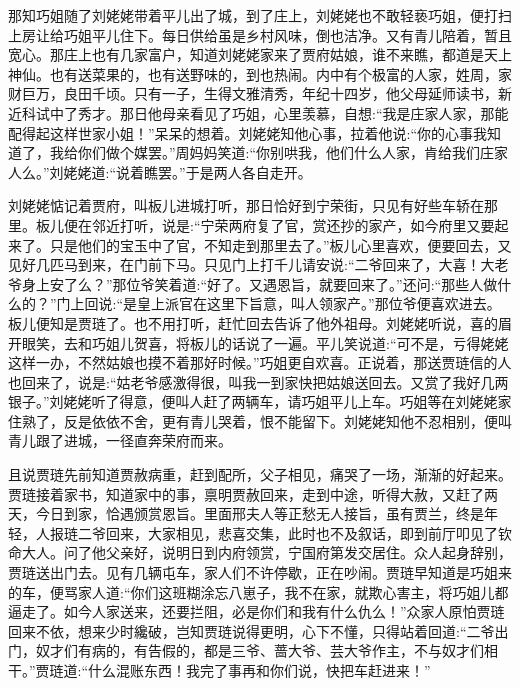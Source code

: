 \begin{parag}
    那知巧姐随了刘姥姥带着平儿出了城，到了庄上，刘姥姥也不敢轻亵巧姐，便打扫上房让给巧姐平儿住下。每日供给虽是乡村风味，倒也洁净。又有青儿陪着，暂且宽心。那庄上也有几家富户，知道刘姥姥家来了贾府姑娘，谁不来瞧，都道是天上神仙。也有送菜果的，也有送野味的，到也热闹。内中有个极富的人家，姓周，家财巨万，良田千顷。只有一子，生得文雅清秀，年纪十四岁，他父母延师读书，新近科试中了秀才。那日他母亲看见了巧姐，心里羡慕，自想:“我是庄家人家，那能配得起这样世家小姐！”呆呆的想着。刘姥姥知他心事，拉着他说:“你的心事我知道了，我给你们做个媒罢。”周妈妈笑道:“你别哄我，他们什么人家，肯给我们庄家人么。”刘姥姥道:“说着瞧罢。”于是两人各自走开。
\end{parag}


\begin{parag}
    刘姥姥惦记着贾府，叫板儿进城打听，那日恰好到宁荣街，只见有好些车轿在那里。板儿便在邻近打听，说是:“宁荣两府复了官，赏还抄的家产，如今府里又要起来了。只是他们的宝玉中了官，不知走到那里去了。”板儿心里喜欢，便要回去，又见好几匹马到来，在门前下马。只见门上打千儿请安说:“二爷回来了，大喜！大老爷身上安了么？”那位爷笑着道:“好了。又遇恩旨，就要回来了。”还问:“那些人做什么的？”门上回说:“是皇上派官在这里下旨意，叫人领家产。”那位爷便喜欢进去。板儿便知是贾琏了。也不用打听，赶忙回去告诉了他外祖母。刘姥姥听说，喜的眉开眼笑，去和巧姐儿贺喜，将板儿的话说了一遍。平儿笑说道:“可不是，亏得姥姥这样一办，不然姑娘也摸不着那好时候。”巧姐更自欢喜。正说着，那送贾琏信的人也回来了，说是:“姑老爷感激得很，叫我一到家快把姑娘送回去。又赏了我好几两银子。”刘姥姥听了得意，便叫人赶了两辆车，请巧姐平儿上车。巧姐等在刘姥姥家住熟了，反是依依不舍，更有青儿哭着，恨不能留下。刘姥姥知他不忍相别，便叫青儿跟了进城，一径直奔荣府而来。
\end{parag}


\begin{parag}
    且说贾琏先前知道贾赦病重，赶到配所，父子相见，痛哭了一场，渐渐的好起来。贾琏接着家书，知道家中的事，禀明贾赦回来，走到中途，听得大赦，又赶了两天，今日到家，恰遇颁赏恩旨。里面邢夫人等正愁无人接旨，虽有贾兰，终是年轻，人报琏二爷回来，大家相见，悲喜交集，此时也不及叙话，即到前厅叩见了钦命大人。问了他父亲好，说明日到内府领赏，宁国府第发交居住。众人起身辞别，贾琏送出门去。见有几辆屯车，家人们不许停歇，正在吵闹。贾琏早知道是巧姐来的车，便骂家人道:“你们这班糊涂忘八崽子，我不在家，就欺心害主，将巧姐儿都逼走了。如今人家送来，还要拦阻，必是你们和我有什么仇么！”众家人原怕贾琏回来不依，想来少时纔破，岂知贾琏说得更明，心下不懂，只得站着回道:“二爷出门，奴才们有病的，有告假的，都是三爷、蔷大爷、芸大爷作主，不与奴才们相干。”贾琏道:“什么混账东西！我完了事再和你们说，快把车赶进来！”
\end{parag}


